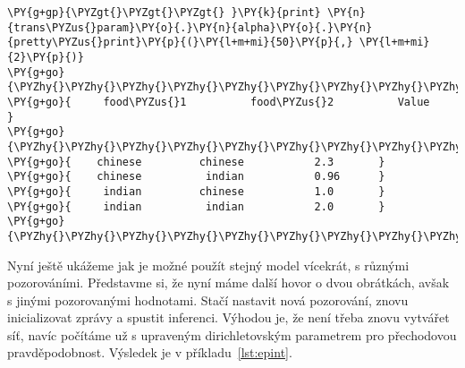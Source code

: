 \begin{example}
\begin{Verbatim}[commandchars=\\\{\}]
\PY{g+gp}{\PYZgt{}\PYZgt{}\PYZgt{} }\PY{k}{print} \PY{n}{trans\PYZus{}param}\PY{o}{.}\PY{n}{alpha}\PY{o}{.}\PY{n}{pretty\PYZus{}print}\PY{p}{(}\PY{l+m+mi}{50}\PY{p}{,} \PY{l+m+mi}{2}\PY{p}{)}
\PY{g+go}{\PYZhy{}\PYZhy{}\PYZhy{}\PYZhy{}\PYZhy{}\PYZhy{}\PYZhy{}\PYZhy{}\PYZhy{}\PYZhy{}\PYZhy{}\PYZhy{}\PYZhy{}\PYZhy{}\PYZhy{}\PYZhy{}\PYZhy{}\PYZhy{}\PYZhy{}\PYZhy{}\PYZhy{}\PYZhy{}\PYZhy{}\PYZhy{}\PYZhy{}\PYZhy{}\PYZhy{}\PYZhy{}\PYZhy{}\PYZhy{}\PYZhy{}\PYZhy{}\PYZhy{}\PYZhy{}\PYZhy{}\PYZhy{}\PYZhy{}\PYZhy{}\PYZhy{}\PYZhy{}\PYZhy{}\PYZhy{}\PYZhy{}\PYZhy{}\PYZhy{}\PYZhy{}\PYZhy{}\PYZhy{}\PYZhy{}\PYZhy{}}
\PY{g+go}{     food\PYZus{}1          food\PYZus{}2          Value      }
\PY{g+go}{\PYZhy{}\PYZhy{}\PYZhy{}\PYZhy{}\PYZhy{}\PYZhy{}\PYZhy{}\PYZhy{}\PYZhy{}\PYZhy{}\PYZhy{}\PYZhy{}\PYZhy{}\PYZhy{}\PYZhy{}\PYZhy{}\PYZhy{}\PYZhy{}\PYZhy{}\PYZhy{}\PYZhy{}\PYZhy{}\PYZhy{}\PYZhy{}\PYZhy{}\PYZhy{}\PYZhy{}\PYZhy{}\PYZhy{}\PYZhy{}\PYZhy{}\PYZhy{}\PYZhy{}\PYZhy{}\PYZhy{}\PYZhy{}\PYZhy{}\PYZhy{}\PYZhy{}\PYZhy{}\PYZhy{}\PYZhy{}\PYZhy{}\PYZhy{}\PYZhy{}\PYZhy{}\PYZhy{}\PYZhy{}\PYZhy{}\PYZhy{}}
\PY{g+go}{    chinese         chinese           2.3       }
\PY{g+go}{    chinese          indian           0.96      }
\PY{g+go}{     indian         chinese           1.0       }
\PY{g+go}{     indian          indian           2.0       }
\PY{g+go}{\PYZhy{}\PYZhy{}\PYZhy{}\PYZhy{}\PYZhy{}\PYZhy{}\PYZhy{}\PYZhy{}\PYZhy{}\PYZhy{}\PYZhy{}\PYZhy{}\PYZhy{}\PYZhy{}\PYZhy{}\PYZhy{}\PYZhy{}\PYZhy{}\PYZhy{}\PYZhy{}\PYZhy{}\PYZhy{}\PYZhy{}\PYZhy{}\PYZhy{}\PYZhy{}\PYZhy{}\PYZhy{}\PYZhy{}\PYZhy{}\PYZhy{}\PYZhy{}\PYZhy{}\PYZhy{}\PYZhy{}\PYZhy{}\PYZhy{}\PYZhy{}\PYZhy{}\PYZhy{}\PYZhy{}\PYZhy{}\PYZhy{}\PYZhy{}\PYZhy{}\PYZhy{}\PYZhy{}\PYZhy{}\PYZhy{}\PYZhy{}}
\end{Verbatim}
\end{example}

Nyní ještě ukážeme jak je možné použít stejný model vícekrát, s různými pozorováními.
Představme si, že nyní máme další hovor o dvou obrátkách, avšak s jinými pozorovanými hodnotami.
Stačí nastavit nová pozorování, znovu inicializovat zprávy a spustit inferenci.
Výhodou je, že není třeba znovu vytvářet síť, navíc počítáme už s upraveným dirichletovským parametrem pro přechodovou pravděpodobnost.
Výsledek je v příkladu~\ref{lst:epint}.

